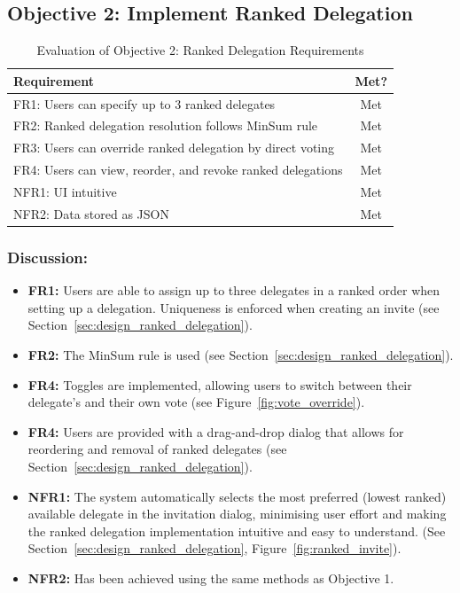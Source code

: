 \subsection{Objective 2: Implement Ranked Delegation}

\begin{table}[H]
\centering
\begin{tabular}{|p{9cm}|c|}
\hline
\textbf{Requirement} & \textbf{Met?} \\ \hline
FR1: Users can specify up to 3 ranked delegates & Met \\ \hline
FR2: Ranked delegation resolution follows MinSum rule & Met \\ \hline
FR3: Users can override ranked delegation by direct voting & Met \\ \hline
FR4: Users can view, reorder, and revoke ranked delegations & Met \\ \hline
NFR1: UI intuitive & Met \\ \hline
NFR2: Data stored as JSON & Met \\ \hline
\end{tabular}
\caption{Evaluation of Objective 2: Ranked Delegation Requirements}
\label{tab:objective2_requirements}
\end{table}

\subsubsection{Discussion:}

\begin{itemize}
    \item \textbf{FR1:} Users are able to assign up to three delegates in a ranked order when setting up a delegation. Uniqueness is enforced when creating an invite (see Section~\ref{sec:design_ranked_delegation}).
    \item \textbf{FR2:} The MinSum rule is used (see Section~\ref{sec:design_ranked_delegation}).
    \item \textbf{FR4:} Toggles are implemented, allowing users to switch between their delegate's and their own vote (see Figure~\ref{fig:vote_override}).
    \item \textbf{FR4:} Users are provided with a drag-and-drop dialog that allows for reordering and removal of ranked delegates (see Section~\ref{sec:design_ranked_delegation}).
    \item \textbf{NFR1:} The system automatically selects the most preferred (lowest ranked) available delegate in the invitation dialog, minimising user effort and making the ranked delegation implementation intuitive and easy to understand. (See Section~\ref{sec:design_ranked_delegation}, Figure~\ref{fig:ranked_invite}).
    \item \textbf{NFR2:} Has been achieved using the same methods as Objective 1.
\end{itemize}

